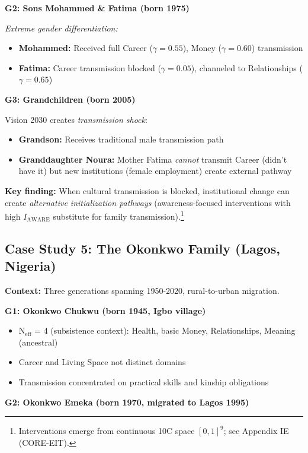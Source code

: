 \textbf{G2: Sons Mohammed \& Fatima (born 1975)}

\textit{Extreme gender differentiation:}
\begin{itemize}[nosep]
\item \textbf{Mohammed:} Received full Career ($\gamma = 0.55$), Money ($\gamma = 0.60$) transmission
\item \textbf{Fatima:} Career transmission blocked ($\gamma = 0.05$), channeled to Relationships ($\gamma = 0.65$)
\end{itemize}

\textbf{G3: Grandchildren (born 2005)}

Vision 2030 creates \textit{transmission shock}:
\begin{itemize}[nosep]
\item \textbf{Grandson:} Receives traditional male transmission path
\item \textbf{Granddaughter Noura:} Mother Fatima \textit{cannot} transmit Career (didn't have it)
      but new institutions (female employment) create external pathway
\end{itemize}

\textbf{Key finding:} When cultural transmission is blocked, institutional change can create
\textit{alternative initialization pathways} (awareness-focused interventions with high $I_{\text{AWARE}}$ substitute for family transmission).\footnote{Interventions emerge from continuous 10C space $[0,1]^9$; see Appendix IE (CORE-EIT).}

\subsection{Case Study 5: The Okonkwo Family (Lagos, Nigeria)}

\textbf{Context:} Three generations spanning 1950-2020, rural-to-urban migration.

\textbf{G1: Okonkwo Chukwu (born 1945, Igbo village)}
\begin{itemize}[nosep]
\item N$_{\text{eff}}$ = 4 (subsistence context): Health, basic Money, Relationships, Meaning (ancestral)
\item Career and Living Space not distinct domains
\item Transmission concentrated on practical skills and kinship obligations
\end{itemize}

\textbf{G2: Okonkwo Emeka (born 1970, migrated to Lagos 1995)}

